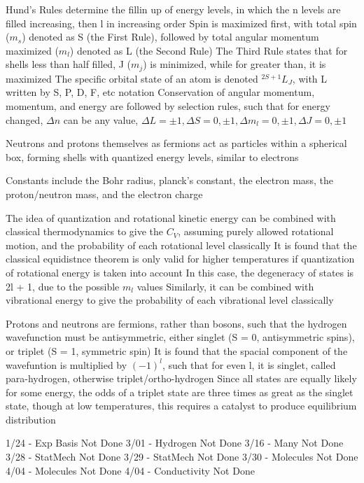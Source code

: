 \documentclass[11 pt, twoside]{article}
\newenvironment{outline*}
{
	\begin{outline}[enumerate]
	}
	{\end{outline}
}
\begin{document}
\begin{outline*}
\1 Hund's Rules determine the fillin up of energy levels, in which the n levels are filled increasing, then l in increasing order
	\2 Spin is maximized first, with total spin ($m_s$) denoted as S (the First Rule), followed by total angular momentum maximized ($m_l$) denoted as L (the Second Rule)
	\2 The Third Rule states that for shells less than half filled, J ($m_j$) is minimized, while for greater than, it is maximized
	\2 The specific orbital state of an atom is denoted $^{2S + 1}L_J$, with L written by S, P, D, F, etc notation
	\2 Conservation of angular momentum, momentum, and energy are followed by selection rules, such that for energy changed, $\Delta n$ can be any value, $\Delta L = \pm 1, \Delta S = 0, \pm 1, \Delta m_l = 0, \pm 1, \Delta J = 0, \pm 1$

\1 Neutrons and protons themselves as fermions act as particles within a spherical box, forming shells with quantized energy levels, similar to electrons

\1 Constants include the Bohr radius, planck's constant, the electron mass, the proton/neutron mass, and the electron charge

\1 The idea of quantization and rotational kinetic energy can be combined with classical thermodynamics to give the $C_V$, assuming purely allowed rotational motion, and the probability of each rotational level classically
	\2 It is found that the classical equidistnce theorem is only valid for higher temperatures if quantization of rotational energy is taken into account
	\2 In this case, the degeneracy of states is 2l + 1, due to the possible $m_l$ values
	\2 Similarly, it can be combined with vibrational energy to give the probability of each vibrational level classically

\1 Protons and neutrons are fermions, rather than bosons, such that the hydrogen wavefunction must be antisymmetric, either singlet (S = 0, antisymmetric spins), or triplet (S = 1, symmetric spin)
	\2 It is found that the spacial component of the wavefuntion is multiplied by $(-1)^l$, such that for even l, it is singlet, called para-hydrogen, otherwise triplet/ortho-hydrogen
	\2 Since all states are equally likely for some energy, the odds of a triplet state are three times as great as the singlet state, though at low temperatures, this requires a catalyst to produce equilibrium distribution

1/24 - Exp Basis Not Done
3/01 - Hydrogen Not Done
3/16 - Many Not Done
3/28 - StatMech Not Done
3/29 - StatMech Not Done
3/30 - Molecules Not Done
4/04 - Molecules Not Done
4/04 - Conductivity Not Done

\end{outline*}
\end{document}
